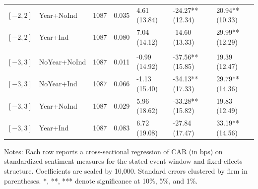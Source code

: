 \begin{table}[p]
\begin{tabular}{l l r r l l l}
$[-2,2]$ & Year+NoInd & 1087 & 0.035 & 4.61 (13.84) & -24.27** (12.34) & 20.94** (10.33) \\
$[-2,2]$ & Year+Ind & 1087 & 0.080 & 7.04 (14.12) & -14.60 (13.33) & 29.99** (12.29) \\
\addlinespace[2pt]
\multicolumn{7}{l}{\textit{Panel: $[-3,3]$}} \\
\addlinespace[1pt]
$[-3,3]$ & NoYear+NoInd & 1087 & 0.011 & -0.99 (14.92) & -37.56** (15.85) & 19.39 (12.47) \\
$[-3,3]$ & NoYear+Ind & 1087 & 0.066 & -1.13 (15.40) & -34.13** (17.33) & 29.79** (14.36) \\
$[-3,3]$ & Year+NoInd & 1087 & 0.029 & 5.96 (18.62) & -33.28** (15.82) & 19.83 (12.49) \\
$[-3,3]$ & Year+Ind & 1087 & 0.083 & 6.72 (19.08) & -27.84 (17.47) & 33.19** (14.56) \\
\bottomrule
\end{tabular}
\parbox{0.95\linewidth}{\footnotesize Notes: Each row reports a cross-sectional regression of CAR (in bps) on standardized sentiment measures for the stated event window and fixed-effects structure. Coefficients are scaled by 10,000. Standard errors clustered by firm in parentheses. *, **, *** denote significance at 10\%, 5\%, and 1\%.}
\end{table}
